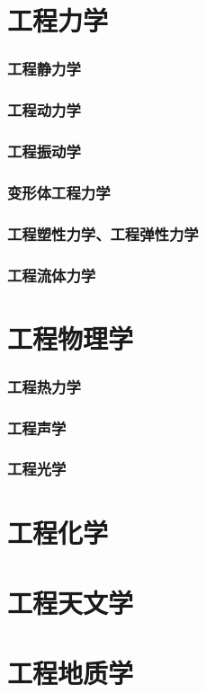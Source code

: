 \documentclass[UTF8]{../../ApplicationUniverse}
\begin{document}
\section{工程力学}
    \subsubsection{工程静力学}
    \subsubsection{工程动力学}
    \subsubsection{工程振动学}
    \subsubsection{变形体工程力学}
    \subsubsection{工程塑性力学、工程弹性力学}
    \subsubsection{工程流体力学}
\section{工程物理学}
    \subsubsection{工程热力学}
    \subsubsection{工程声学}
    \subsubsection{工程光学}


\section{工程化学}
\section{工程天文学}
\section{工程地质学}
\end{document}
